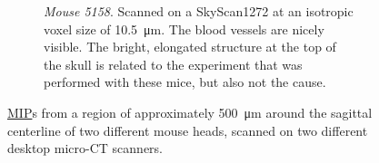 \documentclass[a4paper]{exam}
\newlength\imagewidth%
\newlength\imagescale%
\newcommand{\mct}{micro-CT\xspace}%
\begin{document}
\begin{questions}
\begin{figure}[h]
\begin{subfigure}[t]{0.5\linewidth}
%
      \caption{\emph{Mouse 5158}.
        Scanned on a SkyScan1272 at an isotropic voxel size of \qty{10.5}{\micro\meter}.
        The blood vessels are nicely visible.
      The bright, elongated structure at the top of the skull is related to the experiment that was performed with these mice, but also not the cause.}%
      \label{fig:5158}%
    \end{subfigure}
    \caption{\href{https://en.wikipedia.org/wiki/Maximum_intensity_projection}{MIP}s from a region of approximately \qty{500}{\micro\meter} around the sagittal centerline of two different mouse heads, scanned on two different desktop \mct{} scanners.}
  \end{figure}

\end{questions}
\end{document}
